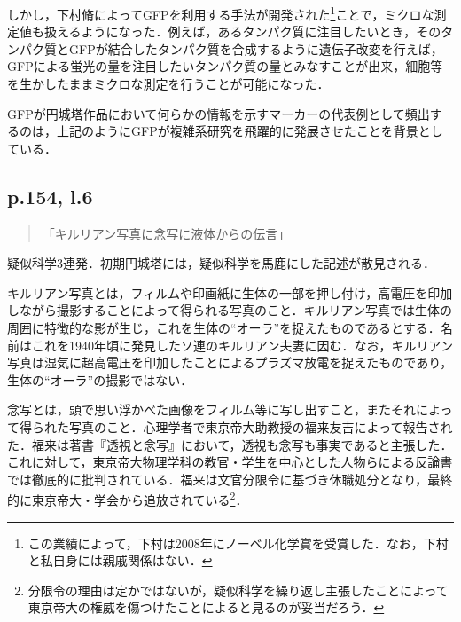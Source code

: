 \documentclass[10pt, a5paper, twoside]{ltjsarticle}
\begin{document}
            しかし，下村脩によってGFPを利用する手法が開発された\footnote{この業績によって，下村は2008年にノーベル化学賞を受賞した．なお，下村と私自身には親戚関係はない．}ことで，ミクロな測定値も扱えるようになった．例えば，あるタンパク質に注目したいとき，そのタンパク質とGFPが結合したタンパク質を合成するように遺伝子改変を行えば，GFPによる蛍光の量を注目したいタンパク質の量とみなすことが出来，細胞等を生かしたままミクロな測定を行うことが可能になった\cite{cell}．

            GFPが円城塔作品において何らかの情報を示すマーカーの代表例として頻出するのは，上記のようにGFPが複雑系研究を飛躍的に発展させたことを背景としている．

        \subsection{p.154, l.6}

            \begin{quote}
                「キルリアン写真に念写に液体からの伝言」
            \end{quote}

            疑似科学3連発．初期円城塔には，疑似科学を馬鹿にした記述が散見される．

            キルリアン写真とは，フィルムや印画紙に生体の一部を押し付け，高電圧を印加しながら撮影することによって得られる写真のこと．キルリアン写真では生体の周囲に特徴的な影が生じ，これを生体の“オーラ”を捉えたものであるとする．名前はこれを1940年頃に発見したソ連のキルリアン夫妻に因む．なお，キルリアン写真は湿気に超高電圧を印加したことによるプラズマ放電を捉えたものであり，生体の“オーラ”の撮影ではない\cite{boyers}．

            念写とは，頭で思い浮かべた画像をフィルム等に写し出すこと，またそれによって得られた写真のこと．心理学者で東京帝大助教授の福来友吉によって報告された．福来は著書『透視と念写』\cite{fukurai}において，透視も念写も事実であると主張した．これに対して，東京帝大物理学科の教官・学生を中心とした人物らによる反論書\cite{fuji}では徹底的に批判されている．福来は文官分限令に基づき休職処分となり，最終的に東京帝大・学会から追放されている\footnote{分限令の理由は定かではないが，疑似科学を繰り返し主張したことによって東京帝大の権威を傷つけたことによると見るのが妥当だろう．}．
\end{document}
